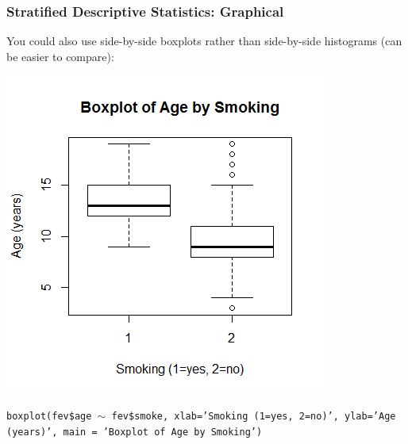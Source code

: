 \documentclass[12pt, 
hyperref={colorlinks=true, linkcolor=blue, urlcolor=cyan}]{beamer}
\begin{document}
\begin{frame}
\frametitle{Stratified Descriptive Statistics: Graphical}

You could also use side-by-side boxplots rather than side-by-side histograms (can be easier to compare): 

\vspace{-0.6cm} \center \includegraphics[height=0.6\textheight]{./boxplot-age-stratified}

\vspace{-0.3cm} \begin{scriptsize} \texttt{boxplot(fev\$age $\sim$ fev\$smoke, xlab='Smoking (1=yes, 2=no)', ylab='Age (years)', main = 'Boxplot of Age by Smoking')\\} \end{scriptsize}

\end{frame}
\end{document}
